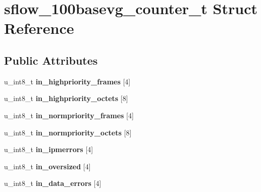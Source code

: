 \hypertarget{structsflow__100basevg__counter__t}{
\section{sflow\_\-100basevg\_\-counter\_\-t Struct Reference}
\label{structsflow__100basevg__counter__t}
}
\subsection*{Public Attributes}
\begin{DoxyCompactItemize}
\item 
\hypertarget{structsflow__100basevg__counter__t_a013a53958dc15f4fe2f6e8d7f7ae9328}{
u\_\-int8\_\-t {\bfseries in\_\-highpriority\_\-frames} \mbox{[}4\mbox{]}}
\label{structsflow__100basevg__counter__t_a013a53958dc15f4fe2f6e8d7f7ae9328}

\item 
\hypertarget{structsflow__100basevg__counter__t_a31faa27847b727d688dc9d5f02fb4211}{
u\_\-int8\_\-t {\bfseries in\_\-highpriority\_\-octets} \mbox{[}8\mbox{]}}
\label{structsflow__100basevg__counter__t_a31faa27847b727d688dc9d5f02fb4211}

\item 
\hypertarget{structsflow__100basevg__counter__t_a22c5ca2a657cf58758500f02ae99425e}{
u\_\-int8\_\-t {\bfseries in\_\-normpriority\_\-frames} \mbox{[}4\mbox{]}}
\label{structsflow__100basevg__counter__t_a22c5ca2a657cf58758500f02ae99425e}

\item 
\hypertarget{structsflow__100basevg__counter__t_a1a907433a01bcaf3ce695d40ea01fc5e}{
u\_\-int8\_\-t {\bfseries in\_\-normpriority\_\-octets} \mbox{[}8\mbox{]}}
\label{structsflow__100basevg__counter__t_a1a907433a01bcaf3ce695d40ea01fc5e}

\item 
\hypertarget{structsflow__100basevg__counter__t_af48a5ab4f613b16cb9423f913edc317e}{
u\_\-int8\_\-t {\bfseries in\_\-ipmerrors} \mbox{[}4\mbox{]}}
\label{structsflow__100basevg__counter__t_af48a5ab4f613b16cb9423f913edc317e}

\item 
\hypertarget{structsflow__100basevg__counter__t_afcec0911567031981a787492923d3916}{
u\_\-int8\_\-t {\bfseries in\_\-oversized} \mbox{[}4\mbox{]}}
\label{structsflow__100basevg__counter__t_afcec0911567031981a787492923d3916}

\item 
\hypertarget{structsflow__100basevg__counter__t_a6156fae9c443854187319c1413752a4a}{
u\_\-int8\_\-t {\bfseries in\_\-data\_\-errors} \mbox{[}4\mbox{]}}
\label{structsflow__100basevg__counter__t_a6156fae9c443854187319c1413752a4a}


\end{DoxyCompactItemize}
